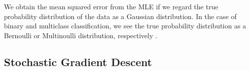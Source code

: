 We obtain the mean squared error from the MLE if we regard the true probability distribution of the data as a Gaussian distribution. In the case of binary and multiclass classification, we see the true probability distribution as a Bernoulli or Multinoulli distribution, respectively \cite[ Ch.\,6,\,pp.\,175-185]{DBLP:books/daglib/0040158}.

\subsection{Stochastic Gradient Descent}
